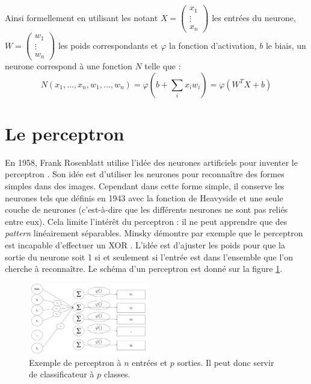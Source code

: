 Ainsi formellement en utilisant les notant $X = \begin{pmatrix} x_1\\ \vdots \\ x_n \end{pmatrix}$  les entrées du neurone, $W = \begin{pmatrix} w_1\\ \vdots \\ w_n \end{pmatrix}$ les poids correspondants et $\varphi$ la fonction d'activation, $b$ le biais, un neurone correspond à une fonction $N$ telle que : $$N(x_1,...,x_n,w_1,...,w_n) = \varphi(b+ \sum\limits_{i} x_i w_i) = \varphi(W^T  X+b)$$



\section{Le perceptron}
En 1958, Frank Rosenblatt utilise l'idée des neurones artificiels pour inventer le perceptron \cite{rosenblatt_perceptron_1958}. Son idée est d'utiliser les neurones pour reconnaître des formes simples dans des images. Cependant dans cette forme simple, il conserve les neurones tels que définis en 1943 avec la fonction de Heavyside et une seule couche de neurones (c'est-à-dire que les différents neurones ne sont pas reliés entre eux). Cela limite l'intérêt du perceptron : il ne peut apprendre que des \textit{pattern} linéairement séparables. Minsky démontre par exemple que le perceptron est incapable d'effectuer un XOR \cite{minsky_perceptrons_2017}. L'idée est d'ajuster les poids pour que la sortie du neurone soit 1 si et seulement si l'entrée est dans l'ensemble que l'on cherche à reconnaître. Le schéma d'un perceptron est donné sur la figure \ref{perceptron}.

\begin{figure}[!h]
\centering
\includegraphics[width=150pt,valign=t]{"images/MLP/perceptron"}
\caption{Exemple de perceptron à $n$ entrées et $p$ sorties. Il peut donc servir de classificateur à $p$ classes.}
\label{perceptron}
\end{figure}

